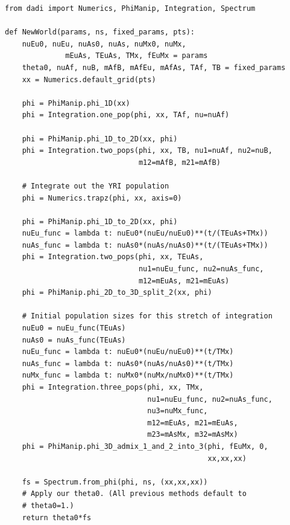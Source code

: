 \documentclass[12pt]{article}
\makeatletter
\newcommand{\dadi}{$\partial$a$\partial$i\xspace}
\newcommand{\py}[1]{\lstinline[language=Python, showstringspaces=False]@#1@}
\makeatother
\begin{document}
\begin{lstlisting}[caption={\textbf{Settlement-of-New-World model from Gutenkunst (2009):} Because \dadi is limited to 3 simultaneous populations, we need to integrate out the African population, using \py{Numerics.trapz}. This model also employs a fixed $\theta$, and ancillary parameters passed in using the third argument.}, float, label={lst:new_world},basicstyle=\tt\footnotesize]
from dadi import Numerics, PhiManip, Integration, Spectrum

def NewWorld(params, ns, fixed_params, pts):
    nuEu0, nuEu, nuAs0, nuAs, nuMx0, nuMx,
              mEuAs, TEuAs, TMx, fEuMx = params
    theta0, nuAf, nuB, mAfB, mAfEu, mAfAs, TAf, TB = fixed_params
    xx = Numerics.default_grid(pts)

    phi = PhiManip.phi_1D(xx)
    phi = Integration.one_pop(phi, xx, TAf, nu=nuAf)

    phi = PhiManip.phi_1D_to_2D(xx, phi)
    phi = Integration.two_pops(phi, xx, TB, nu1=nuAf, nu2=nuB, 
                               m12=mAfB, m21=mAfB)

    # Integrate out the YRI population
    phi = Numerics.trapz(phi, xx, axis=0)

    phi = PhiManip.phi_1D_to_2D(xx, phi)
    nuEu_func = lambda t: nuEu0*(nuEu/nuEu0)**(t/(TEuAs+TMx))
    nuAs_func = lambda t: nuAs0*(nuAs/nuAs0)**(t/(TEuAs+TMx))
    phi = Integration.two_pops(phi, xx, TEuAs, 
                               nu1=nuEu_func, nu2=nuAs_func, 
                               m12=mEuAs, m21=mEuAs)
    phi = PhiManip.phi_2D_to_3D_split_2(xx, phi)

    # Initial population sizes for this stretch of integration
    nuEu0 = nuEu_func(TEuAs)
    nuAs0 = nuAs_func(TEuAs)
    nuEu_func = lambda t: nuEu0*(nuEu/nuEu0)**(t/TMx)
    nuAs_func = lambda t: nuAs0*(nuAs/nuAs0)**(t/TMx)
    nuMx_func = lambda t: nuMx0*(nuMx/nuMx0)**(t/TMx)
    phi = Integration.three_pops(phi, xx, TMx, 
                                 nu1=nuEu_func, nu2=nuAs_func, 
                                 nu3=nuMx_func,
                                 m12=mEuAs, m21=mEuAs,
                                 m23=mAsMx, m32=mAsMx)
    phi = PhiManip.phi_3D_admix_1_and_2_into_3(phi, fEuMx, 0,
                                               xx,xx,xx)

    fs = Spectrum.from_phi(phi, ns, (xx,xx,xx))
    # Apply our theta0. (All previous methods default to 
    # theta0=1.)
    return theta0*fs
\end{lstlisting}
\end{document}
